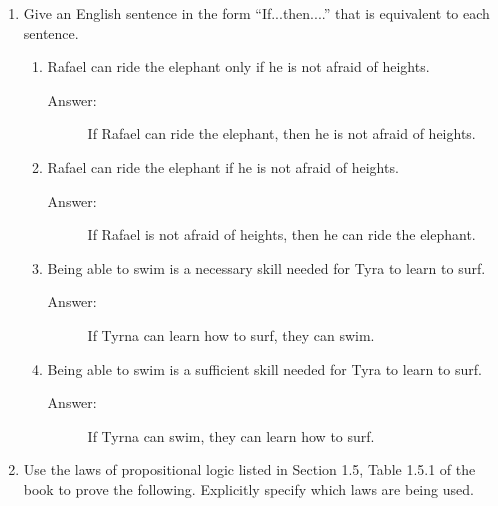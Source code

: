 \documentclass[12pt, oneside]{article}
\begin{document}
\begin{enumerate}
\begin{enumerate}
\end{enumerate}




\item Give an English sentence in the form ``If...then....'' that is equivalent to each sentence.
\begin{enumerate}

    \item Rafael can ride the elephant only if he is not afraid of heights.
    \begin{description}
        \item[Answer:] If Rafael can ride the elephant, then he is not afraid of heights.
    \end{description}
    \item Rafael can ride the elephant if he is not afraid of heights.
    \begin{description}
        \item[Answer:] If Rafael is not afraid of heights, then he can ride the elephant.
    \end{description}
    \item Being able to swim is a necessary skill needed for Tyra to learn to surf.
    \begin{description}
        \item[Answer:] If Tyrna can learn how to surf, they can swim.
    \end{description}
    \item Being able to swim is a sufficient skill needed for Tyra to learn to surf.
    \begin{description}
        \item[Answer:] If Tyrna can swim, they can learn how to surf.
    \end{description}
\end{enumerate}



\item Use the laws of propositional logic listed in Section 1.5, Table 1.5.1 of the book to prove the following. Explicitly specify which laws are being used.


\end{enumerate}
\end{document}
